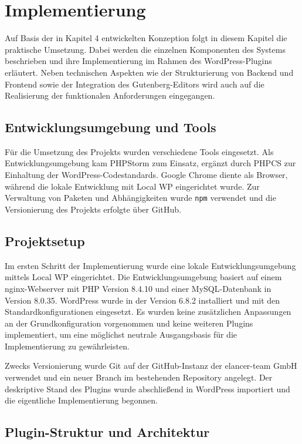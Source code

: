 \chapter{Implementierung}
\label{chap:implementation}
Auf Basis der in Kapitel 4 entwickelten Konzeption folgt in diesem Kapitel die praktische Umsetzung.
Dabei werden die einzelnen Komponenten des Systems beschrieben und ihre Implementierung im Rahmen des WordPress-Plugins erläutert.
Neben technischen Aspekten wie der Strukturierung von Backend und Frontend sowie der Integration des Gutenberg-Editors wird auch auf die Realisierung der funktionalen Anforderungen eingegangen.

\section{Entwicklungsumgebung und Tools}
Für die Umsetzung des Projekts wurden verschiedene Tools eingesetzt.
Als Entwicklungsumgebung kam PHPStorm zum Einsatz, ergänzt durch PHPCS zur Einhaltung der WordPress-Codestandards.
Google Chrome diente als Browser, während die lokale Entwicklung mit Local WP eingerichtet wurde.
Zur Verwaltung von Paketen und Abhängigkeiten wurde \texttt{npm} verwendet und die Versionierung des Projekts erfolgte über GitHub.

\section{Projektsetup}
Im ersten Schritt der Implementierung wurde eine lokale Entwicklungsumgebung mittels Local WP eingerichtet.
Die Entwicklungsumgebung basiert auf einem nginx-Webserver mit PHP Version 8.4.10 und einer MySQL-Datenbank in Version 8.0.35.
WordPress wurde in der Version 6.8.2 installiert und mit den Standardkonfigurationen eingesetzt.
Es wurden keine zusätzlichen Anpassungen an der Grundkonfiguration vorgenommen und keine weiteren Plugins implementiert, um eine möglichst neutrale Ausgangsbasis für die Implementierung zu gewährleisten.

Zwecks Versionierung wurde Git auf der GitHub-Instanz der elancer-team GmbH verwendet und ein neuer Branch im bestehenden Repository angelegt.
Der deskriptive Stand des Plugins wurde abschließend in WordPress importiert und die eigentliche Implementierung begonnen.

\section{Plugin-Struktur und Architektur}
